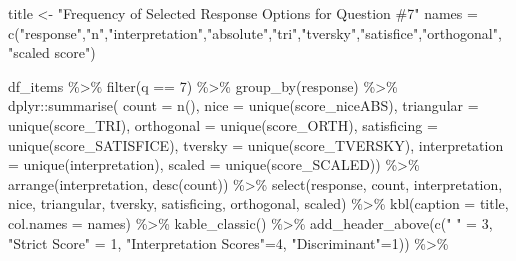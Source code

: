 \documentclass[
  letterpaper,
  DIV=11,
  numbers=noendperiod]{scrreprt}
\newenvironment{Shaded}{\begin{snugshade}}{\end{snugshade}}
\newcommand{\AttributeTok}[1]{\textcolor[rgb]{0.40,0.45,0.13}{#1}}
\newcommand{\DecValTok}[1]{\textcolor[rgb]{0.68,0.00,0.00}{#1}}
\newcommand{\FunctionTok}[1]{\textcolor[rgb]{0.28,0.35,0.67}{#1}}
\newcommand{\NormalTok}[1]{\textcolor[rgb]{0.00,0.23,0.31}{#1}}
\newcommand{\OtherTok}[1]{\textcolor[rgb]{0.00,0.23,0.31}{#1}}
\newcommand{\SpecialCharTok}[1]{\textcolor[rgb]{0.37,0.37,0.37}{#1}}
\newcommand{\StringTok}[1]{\textcolor[rgb]{0.13,0.47,0.30}{#1}}
\begin{document}
\begin{Shaded}
\begin{Highlighting}[]
\NormalTok{title }\OtherTok{\textless{}{-}} \StringTok{"Frequency of Selected Response Options for Question \#7"}
\NormalTok{names }\OtherTok{=} \FunctionTok{c}\NormalTok{(}\StringTok{"response"}\NormalTok{,}\StringTok{"n"}\NormalTok{,}\StringTok{"interpretation"}\NormalTok{,}\StringTok{"absolute"}\NormalTok{,}\StringTok{"tri"}\NormalTok{,}\StringTok{"tversky"}\NormalTok{,}\StringTok{"satisfice"}\NormalTok{,}\StringTok{"orthogonal"}\NormalTok{, }\StringTok{"scaled score"}\NormalTok{)}

\NormalTok{df\_items }\SpecialCharTok{\%\textgreater{}\%} \FunctionTok{filter}\NormalTok{(q }\SpecialCharTok{==} \DecValTok{7}\NormalTok{) }\SpecialCharTok{\%\textgreater{}\%} \FunctionTok{group\_by}\NormalTok{(response) }\SpecialCharTok{\%\textgreater{}\%}
\NormalTok{  dplyr}\SpecialCharTok{::}\FunctionTok{summarise}\NormalTok{( }\AttributeTok{count =} \FunctionTok{n}\NormalTok{(),}
                    \AttributeTok{nice =} \FunctionTok{unique}\NormalTok{(score\_niceABS),}
                    \AttributeTok{triangular =} \FunctionTok{unique}\NormalTok{(score\_TRI),}
                    \AttributeTok{orthogonal =}  \FunctionTok{unique}\NormalTok{(score\_ORTH),}
                    \AttributeTok{satisficing =}  \FunctionTok{unique}\NormalTok{(score\_SATISFICE),}
                    \AttributeTok{tversky =} \FunctionTok{unique}\NormalTok{(score\_TVERSKY),}
                    \AttributeTok{interpretation =} \FunctionTok{unique}\NormalTok{(interpretation),}
                    \AttributeTok{scaled =} \FunctionTok{unique}\NormalTok{(score\_SCALED)) }\SpecialCharTok{\%\textgreater{}\%}
  \FunctionTok{arrange}\NormalTok{(interpretation, }\FunctionTok{desc}\NormalTok{(count)) }\SpecialCharTok{\%\textgreater{}\%}
  \FunctionTok{select}\NormalTok{(response, count, interpretation, nice,}
\NormalTok{         triangular, tversky, satisficing, orthogonal, scaled) }\SpecialCharTok{\%\textgreater{}\%}
  \FunctionTok{kbl}\NormalTok{(}\AttributeTok{caption =}\NormalTok{ title, }\AttributeTok{col.names =}\NormalTok{ names) }\SpecialCharTok{\%\textgreater{}\%}  \FunctionTok{kable\_classic}\NormalTok{() }\SpecialCharTok{\%\textgreater{}\%}
  \FunctionTok{add\_header\_above}\NormalTok{(}\FunctionTok{c}\NormalTok{(}\StringTok{" "} \OtherTok{=} \DecValTok{3}\NormalTok{, }\StringTok{"Strict Score"} \OtherTok{=} \DecValTok{1}\NormalTok{, }\StringTok{"Interpretation Scores"}\OtherTok{=}\DecValTok{4}\NormalTok{, }\StringTok{"Discriminant"}\OtherTok{=}\DecValTok{1}\NormalTok{)) }\SpecialCharTok{\%\textgreater{}\%}

\end{Highlighting}
\end{Shaded}
\end{document}
